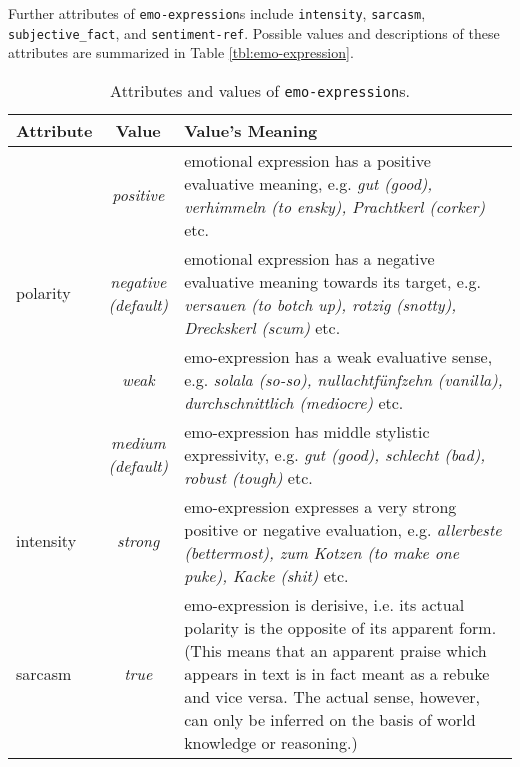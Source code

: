 \documentclass[11pt,a4paper]{article}
\newlength{\clmnwidth}
\theoremstyle{mytheoremstyle}
\begin{document}
Further attributes of \texttt{emo-expression}s include
\texttt{intensity}, \texttt{sarcasm}, \texttt{subjective\_fact}, and
\texttt{sentiment-ref}.  Possible values and descriptions of these
attributes are summarized in Table \ref{tbl:emo-expression}.
\begin{center}
  \begin{table}[ht]
    \caption{Attributes and values of \texttt{emo-expression}s.}
    \begin{tabular}{|l|c|p{0.935\clmnwidth}|}\hline
      Attribute & Value & Value's Meaning\\\hline

      & \textit{positive} & emotional expression has a positive
      evaluative meaning, e.g. \textit{gut (good), verhimmeln (to
        ensky), Prachtkerl (corker)} etc.\\\cline{2-3}

      \multirow{-2}{*}{polarity} & \textit{negative\newline(default)}
      & emotional expression has a negative evaluative meaning towards
      its target, e.g. \textit{versauen (to botch up), rotzig
        (snotty), Dreckskerl (scum)} etc.\\\hline


      & \textit{weak} & emo-expression has a weak evaluative sense,
      e.g. \textit{solala (so-so), nullachtf\"unfzehn (vanilla),
        durchschnittlich (mediocre)} etc.\\\cline{2-3}

      & \textit{medium\newline(default)} & emo-expression has middle
      stylistic expressivity, e.g. \textit{gut (good), schlecht (bad),
        robust (tough)} etc.\\\cline{2-3}

      \multirow{-3}{*}{intensity} & \textit{strong} & emo-expression
      expresses a very strong positive or negative evaluation,
      e.g. \textit{allerbeste (bettermost), zum Kotzen (to make one
        puke), Kacke (shit)} etc.\\\hline


      \multirow{2}{*}{sarcasm} & \textit{true} & emo-expression is
      derisive, i.e. its actual polarity is the opposite of its
      apparent form. (This means that an apparent praise which appears
      in text is in fact meant as a rebuke and vice versa. The actual
      sense, however, can only be inferred on the basis of world
      knowledge or reasoning.)\\\cline{2-3}


\end{tabular}
\end{table}
\end{center}
\end{document}
